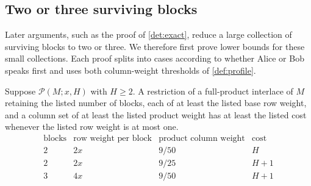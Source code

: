 \documentclass[11pt,letterpaper]{article} \usepackage[utf8]{inputenc}
\theoremstyle{plain} \newtheorem{theorem}{Theorem}[section]
\theoremstyle{definition} \newaliascnt{definition}{theorem}
\newcommand{\RP}[3]{\mathcal{P}(#1;#2,#3)}
\begin{document}
\subsection{Two or three surviving blocks}

Later arguments, such as the proof of \cref{det:exact}, reduce a large
collection of surviving blocks to two or three. We therefore first prove lower
bounds for these small collections. Each proof splits into cases according
to whether Alice or Bob speaks first and uses both column-weight thresholds of \cref{def:profile}.

\begin{lemma}\label{lem:small-blocks}
Suppose $\RP{M}{x}{H}$ with $H\ge2$. A restriction of a full-product interlace of $M$
retaining the listed number of blocks, each of at least the listed base row weight,
and a column set of at least the listed product weight has at least the listed cost
whenever the listed row weight is at most one.
\[
\begin{array}{c|c|c|c}
\text{blocks}&\text{row weight per block}&\text{product column weight}&\text{cost}\\
\hline
2&2x&9/50&H\\
2&2x&9/25&H+1\\
3&4x&9/50&H+1
\end{array}
\]
\end{lemma}
\end{document}
